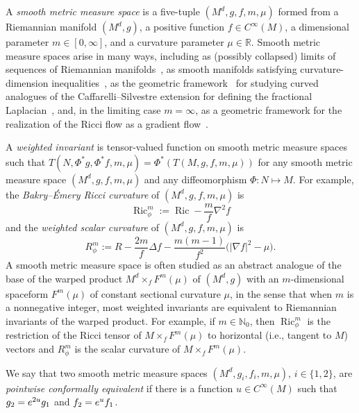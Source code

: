 \documentclass[11pt]{article}
\numberwithin{equation}{section}
\DeclareMathOperator{\Ric}{Ric}
\newcommand{\lv}{\lvert}
\newcommand{\rv}{\rvert}
\newcommand{\bN}{\mathbb{N}}
\newcommand{\bR}{\mathbb{R}}
\numberwithin{equation}{section}
\begin{document}
A \emph{smooth metric measure space} is a five-tuple $(M^d,g,f,m,\mu)$ formed from a Riemannian manifold $(M^d,g)$, a positive function $f\in C^\infty(M)$, a dimensional parameter $m\in[0,\infty]$, and a curvature parameter $\mu\in\bR$. Smooth metric measure spaces arise in many ways, including as (possibly collapsed) limits of sequences of Riemannian manifolds~\cite{CheegerColding2000a}, as smooth manifolds satisfying curvature-dimension inequalities~\cite{BakryEmery1985,Wei_Wylie}, as the geometric framework~\cite{CaseChang2013} for studying curved analogues of the Caffarelli--Silvestre extension for defining the fractional Laplacian~\cite{CaffarelliSilvestre2007}, and, in the limiting case $m=\infty$, as a geometric framework for the realization of the Ricci flow as a gradient flow~\cite{Perelman1}.


A \emph{weighted invariant} is tensor-valued function on smooth metric measure spaces such that $T(N,\Phi^\ast g,\Phi^\ast f,m,\mu) \!=\! \Phi^\ast(T(M,g,f,m,\mu))$ for any smooth metric measure space $(M^d,g,f,m,\mu)$ and any diffeomorphism $\Phi \colon N \mapsto M$.
For example, the \emph{Bakry--\'Emery Ricci curvature} of $(M^d,g,f,m,\mu)$ is
\begin{equation*}
 \Ric_\phi^m := \Ric - \frac{m}{f}\nabla^2f
\end{equation*}
and the \emph{weighted scalar curvature} of $(M^d,g,f,m,\mu)$ is
\begin{equation*}
 R_\phi^m := R - \frac{2m}{f}\Delta f - \frac{m(m-1)}{f^2}\bigl( \lv\nabla f\rv^2 - \mu \bigr) .
\end{equation*}
A smooth metric measure space is often studied as an abstract analogue of the base of the warped product $M^d \times_f F^m(\mu)$ of $(M^d,g)$ with an $m$-dimensional spaceform $F^m(\mu)$ of constant sectional curvature $\mu$, in the sense that when $m$ is a nonnegative integer, most weighted invariants are equivalent to Riemannian invariants of the warped product.
For example, if $m \in \bN_0$, then $\Ric_\phi^m$ is the restriction of the Ricci tensor of $M \times_f F^m(\mu)$ to horizontal (i.e., tangent to $M$) vectors and $R_\phi^m$ is the scalar curvature of $M \times_f F^m(\mu)$.


We say that two smooth metric measure spaces $(M^d,g_i,f_i,m,\mu)$, $i\in\{1,2\}$, are \emph{pointwise conformally equivalent} if there is a function $u\in C^\infty(M)$ such that $g_2={\rm e}^{2u}g_1$ and $f_2={\rm e}^uf_1$.

\setcounter{section}{1}
\end{document}
